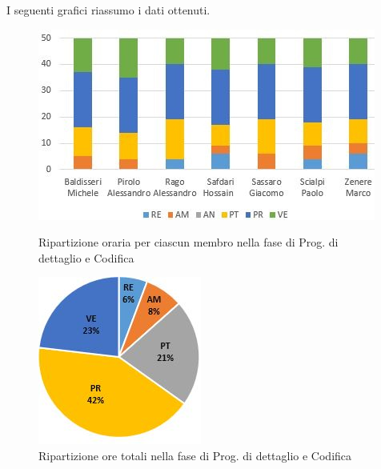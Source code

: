 I seguenti grafici riassumo i dati ottenuti.

\begin{figure}[!htb]
   \begin{minipage}{0.6\textwidth}
     \centering
     \includegraphics{Images/PO-Codifica}
     \caption{Ripartizione oraria per ciascun membro nella fase di Prog. di dettaglio e Codifica}
   \end{minipage}\hspace{0.1\textwidth}
   \begin{minipage}{0.3\textwidth}
     \centering
     \includegraphics[width=.9\textwidth]{Images/PE-Codifica}
     \captionsetup{width=.9\textwidth}
     \caption{Ripartizione ore totali nella fase di Prog. di dettaglio e Codifica}
   \end{minipage}
\end{figure}
